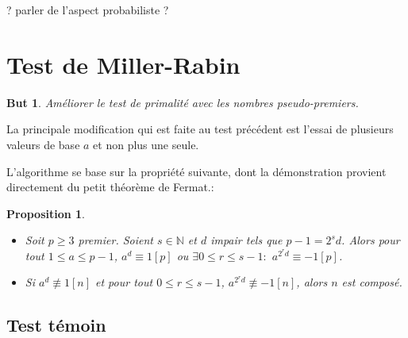 \documentclass[12pt]{report}
\newtheorem*{but}{But}
\newtheorem{Prop}[thm]{Proposition}
\begin{document}
? parler de l'aspect probabiliste ?



\section{Test de Miller-Rabin}

\begin{but}Améliorer le test de primalité avec les nombres pseudo-premiers.
\end{but}

La principale modification qui est faite au test précédent est l'essai de plusieurs valeurs de base $a$ et non plus une seule.

L'algorithme se base sur la propriété suivante, dont la démonstration provient directement du petit théorème de Fermat.:

\begin{Prop}
\begin{itemize}
\item[•] Soit $p \geq 3$ premier. Soient $s \in \mathbb{N}$ et $d$ impair tels que $p-1=2^s d$. Alors pour tout $1 \leq a \leq p-1$, $a^d \equiv 1 [p]$ ou $\exists 0 \leq r \leq s-1:$ $a^{2^r d}\equiv -1 [p]$.
\item[•] Si $a^d \not \equiv 1 [n]$ et pour tout $0 \leq r \leq s-1$, $a^{2^r d} \not \equiv -1 [n]$, alors $n$ est composé. 
\end{itemize}
\end{Prop}

\subsection*{Test témoin}

\\
\end{document}
